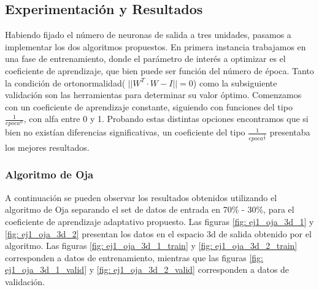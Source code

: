 \subsection{Experimentación y Resultados}

\par Habiendo fijado el número de neuronas de salida a tres unidades, pasamos a implementar los dos algoritmos propuestos. En primera instancia trabajamos en una fase de entrenamiento, donde el parámetro de interés a optimizar es el coeficiente de aprendizaje, que bien puede ser función del número de época. Tanto la condición de ortonormalidad( $|| W^T \cdot W - I || = 0$) como la subsiguiente validación son las herramientas para determinar su valor óptimo. Comenzamos con un coeficiente de aprendizaje constante, siguiendo con funciones del tipo $\frac{1}{epoca^{\alpha}}$, con alfa entre 0 y 1. Probando estas distintas opciones encontramos que si bien no existían diferencias significativas, un coeficiente del tipo $\frac{1}{epoca^{\frac{1}{2}}}$ presentaba los mejores resultados.

\subsubsection{Algoritmo de Oja}

\par A continuación se pueden observar los resultados obtenidos utilizando el algoritmo de Oja separando el set de datos de entrada en 70\% - 30\%, para el coeficiente de aprendizaje adaptativo propuesto. Las figuras \ref{fig:  ej1_oja_3d_1} y \ref{fig: ej1_oja_3d_2} presentan los datos en el espacio 3d de salida obtenido por el algoritmo. Las figuras \ref{fig: ej1_oja_3d_1_train} y \ref{fig: ej1_oja_3d_2_train} corresponden a datos de entrenamiento, mientras que las figuras \ref{fig: ej1_oja_3d_1_valid} y \ref{fig: ej1_oja_3d_2_valid} corresponden a datos de validación. 


